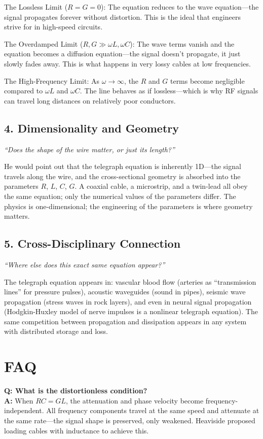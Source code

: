 The Lossless Limit ($R = G = 0$): The equation reduces to the wave equation---the signal propagates forever without distortion. This is the ideal that engineers strive for in high-speed circuits.

The Overdamped Limit ($R, G \gg \omega L, \omega C$): The wave terms vanish and the equation becomes a diffusion equation---the signal doesn't propagate, it just slowly fades away. This is what happens in very lossy cables at low frequencies.

The High-Frequency Limit: As $\omega \to \infty$, the $R$ and $G$ terms become negligible compared to $\omega L$ and $\omega C$. The line behaves as if lossless---which is why RF signals can travel long distances on relatively poor conductors.

\subsection*{4. Dimensionality and Geometry}
\textit{``Does the shape of the wire matter, or just its length?''}

He would point out that the telegraph equation is inherently 1D---the signal travels along the wire, and the cross-sectional geometry is absorbed into the parameters $R$, $L$, $C$, $G$. A coaxial cable, a microstrip, and a twin-lead all obey the same equation; only the numerical values of the parameters differ. The physics is one-dimensional; the engineering of the parameters is where geometry matters.

\subsection*{5. Cross-Disciplinary Connection}
\textit{``Where else does this exact same equation appear?''}

The telegraph equation appears in: vascular blood flow (arteries as ``transmission lines'' for pressure pulses), acoustic waveguides (sound in pipes), seismic wave propagation (stress waves in rock layers), and even in neural signal propagation (Hodgkin-Huxley model of nerve impulses is a nonlinear telegraph equation). The same competition between propagation and dissipation appears in any system with distributed storage and loss.
\section*{FAQ}

\textbf{Q: What is the distortionless condition?}\\
\textbf{A:} When $RC = GL$, the attenuation and phase velocity become frequency-independent. All frequency components travel at the same speed and attenuate at the same rate---the signal shape is preserved, only weakened. Heaviside proposed loading cables with inductance to achieve this.

